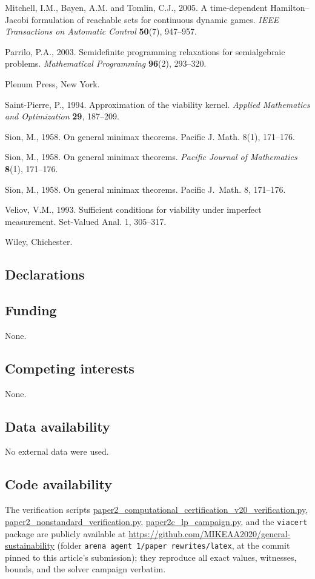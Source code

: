 \documentclass[10pt,twocolumn]{article}
\theoremstyle{plain}
\theoremstyle{definition}
\theoremstyle{remark}
\begin{document}
Mitchell, I.M., Bayen, A.M. and Tomlin, C.J., 2005. A time-dependent Hamilton--Jacobi
formulation of reachable sets for continuous dynamic games. \emph{IEEE Transactions on
Automatic Control} \textbf{50}(7), 947--957.

Parrilo, P.A., 2003. Semidefinite programming relaxations for semialgebraic problems.
\emph{Mathematical Programming} \textbf{96}(2), 293--320.

Plenum Press, New York.

Saint-Pierre, P., 1994. Approximation of the viability kernel. \emph{Applied Mathematics and
Optimization} \textbf{29}, 187--209.

Sion, M., 1958. On general minimax theorems. Pacific J. Math. 8(1),
171--176.

Sion, M., 1958. On general minimax theorems. \emph{Pacific Journal of Mathematics}
\textbf{8}(1), 171--176.

Sion, M., 1958. On general minimax theorems. Pacific J.\ Math. 8, 171--176.

Veliov, V.M., 1993. Sufficient conditions for viability under imperfect
measurement. Set-Valued Anal. 1, 305--317.

Wiley, Chichester.

\subsection*{Declarations}

\subsection*{Funding}
None.

\subsection*{Competing interests}
None.

\subsection*{Data availability}
No external data were used.

\subsection*{Code availability}
The verification scripts
\url{paper2_computational_certification_v20_verification.py},
\url{paper2_nonstandard_verification.py},
\url{paper2c_lp_campaign.py}, and the \texttt{viacert} package are publicly
available at \url{https://github.com/MIKEAA2020/general-sustainability}
(folder \texttt{arena agent 1/paper rewrites/latex}, at the commit
pinned to this article's submission); they reproduce all exact values,
witnesses, bounds, and the solver campaign verbatim.
\end{document}
